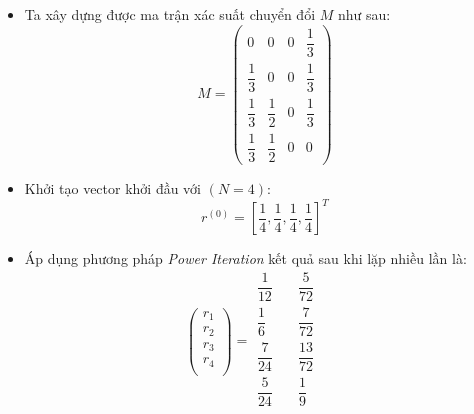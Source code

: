\begin{itemize}
\item Ta xây dựng được ma trận xác suất chuyển đổi $M$ như sau:\\
            $$ M = 
            \begin{pmatrix}
                  0 & 0 & 0 & \dfrac{1}{3} \\[10pt]
                \dfrac{1}{3} & 0 & 0 & \dfrac{1}{3} \\[10pt]
                \dfrac{1}{3} & \dfrac{1}{2} & 0 & \dfrac{1}{3} \\[10pt]
                \dfrac{1}{3} & \dfrac{1}{2} & 0 & 0
            \end{pmatrix}
            $$
\item Khởi tạo vector khởi đầu với $(N = 4)$: 
             $$
                 r^{(0)} = \left[\frac{1}{4},\frac{1}{4},\frac{1}{4},\frac{1}{4}\right] ^ T 
            $$
\item Áp dụng phương pháp \emph{Power Iteration} kết quả sau khi lặp nhiều lần là: 
     $$ 
                \begin{pmatrix}
                    r_1 \\[15pt]
                    r_2 \\[15pt]
                    r_3 \\[15pt]
                    r_4 \\[15pt]
                \end{pmatrix}
                =
                \begin{matrix}
                    \dfrac{1}{12} \\[10pt]
                    \dfrac{1}{6} \\[10pt]
                    \dfrac{7}{24}\\[10pt]
                    \dfrac{5}{24} \\[10pt]
                \end{matrix}
                \quad
                \begin{matrix}
                    \dfrac{5}{72} \\[10pt]
                    \dfrac{7}{72} \\[10pt]
                    \dfrac{13}{72}\\[10pt]
                    \dfrac{1}{9} \\[10pt]
                \end{matrix}
                \quad
                \begin{matrix}

\end{matrix}$$
\end{itemize}
